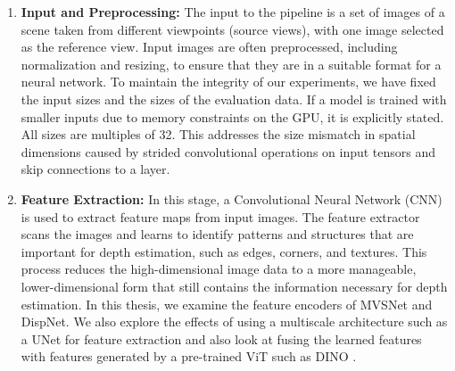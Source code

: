 \begin{enumerate}
\item \textbf{Input and Preprocessing:} The input to the pipeline is a set of images of a scene taken from different viewpoints (source views), with one image selected as the reference view. Input images are often preprocessed, including normalization and resizing, to ensure that they are in a suitable format for a neural network. To maintain the integrity of our experiments, we have fixed the input sizes and the sizes of the evaluation data. If a model is trained with smaller inputs due to memory constraints on the GPU, it is explicitly stated. All sizes are multiples of 32. This addresses the size mismatch in spatial dimensions caused by strided convolutional operations on input tensors and skip connections to a layer.

\item \textbf{Feature Extraction:} In this stage, a Convolutional Neural Network (CNN) is used to extract feature maps from input images. The feature extractor scans the images and learns to identify patterns and structures that are important for depth estimation, such as edges, corners, and textures. This process reduces the high-dimensional image data to a more manageable, lower-dimensional form that still contains the information necessary for depth estimation. In this thesis, we examine the feature encoders of MVSNet and DispNet. We also explore the effects of using a multiscale architecture such as a UNet \cite{ronneberger2015unet}  for feature extraction and also look at fusing the learned features with features generated by a pre-trained ViT such as DINO \cite{caron2021emerging}. 


\end{enumerate}
